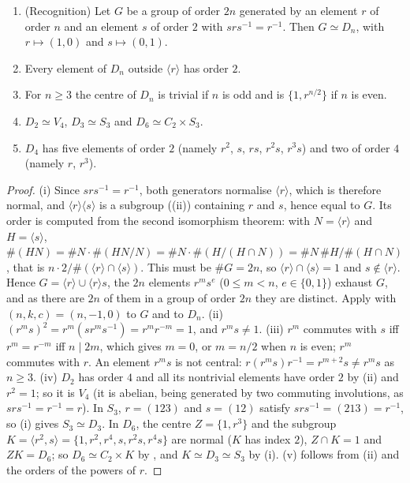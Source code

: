 \begin{proposition}\label{prop:groups:dihedral}
\begin{enumerate}[label=(\roman*)]
\item (Recognition) Let $G$ be a group of order $2n$ generated by an element $r$ of order $n$ and an element $s$ of order $2$ with
$srs^{-1}=r^{-1}$. Then $G\simeq D_n$, with $r\mapsto(1,0)$ and $s\mapsto(0,1)$.
\item Every element of $D_n$ outside $\langle r\rangle$ has order $2$.
\item For $n\ge3$ the centre of $D_n$ is trivial if $n$ is odd and is $\{1,r^{n/2}\}$ if $n$ is even.
\item $D_2\simeq V_4$, $D_3\simeq S_3$ and $D_6\simeq C_2\times S_3$.
\item $D_4$ has five elements of order $2$ (namely $r^2$, $s$, $rs$, $r^2s$, $r^3s$) and two of order $4$ (namely $r$, $r^3$).
\end{enumerate}
\end{proposition}

\begin{proof}
(i) Since $srs^{-1}=r^{-1}$, both generators normalise $\langle r\rangle$, which is therefore normal, and $\langle r\rangle\langle s\rangle$ is a subgroup
((ii)) containing $r$ and $s$, hence equal to $G$. Its order is computed from the second isomorphism theorem: with
$N=\langle r\rangle$ and $H=\langle s\rangle$, $\#(HN)=\#N\cdot\#(HN/N)=\#N\cdot\#(H/(H\cap N))=\#N\,\#H/\#(H\cap N)$, that is
$n\cdot2/\#(\langle r\rangle\cap\langle s\rangle)$. This must be $\#G=2n$, so $\langle r\rangle\cap\langle s\rangle=1$ and $s\notin\langle r\rangle$. Hence $G=\langle r\rangle\cup\langle r\rangle s$, the
$2n$ elements $r^ms^e$ ($0\le m<n$, $e\in\{0,1\}$) exhaust $G$, and as there are $2n$ of them in a group of order $2n$ they are distinct. Apply  with $(n,k,c)=(n,-1,0)$ to $G$ and
to $D_n$. (ii) $(r^ms)^2=r^m(sr^ms^{-1})=r^mr^{-m}=1$, and $r^ms\ne1$. (iii) $r^m$ commutes with $s$ iff $r^m=r^{-m}$ iff $n\mid2m$, which gives
$m=0$, or $m=n/2$ when $n$ is even; $r^m$ commutes with $r$. An element $r^ms$ is not central: $r(r^ms)r^{-1}=r^{m+2}s\ne r^ms$ as $n\ge3$.
(iv) $D_2$ has order $4$ and all its nontrivial elements have order $2$ by (ii) and $r^2=1$; so it is $V_4$ (it is abelian, being generated by
two commuting involutions, as $srs^{-1}=r^{-1}=r$). In $S_3$, $r=(123)$ and $s=(12)$ satisfy $srs^{-1}=(213)=r^{-1}$, so (i) gives $S_3\simeq D_3$. In $D_6$, the
centre $Z=\{1,r^3\}$ and the subgroup $K=\langle r^2,s\rangle=\{1,r^2,r^4,s,r^2s,r^4s\}$ are normal ($K$ has index $2$), $Z\cap K=1$ and $ZK=D_6$; so
$D_6\simeq C_2\times K$ by , and $K\simeq D_3\simeq S_3$ by (i). (v) follows from (ii) and the orders of the powers of $r$.
\end{proof}

